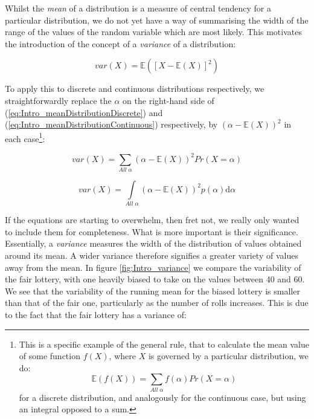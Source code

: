 \documentclass[11pt,fullpage]{book}
\begin{document}
Whilst the \textit{mean} of a distribution is a measure of central tendency for a particular distribution, we do not yet have a way of summarising the width of the range of the values of the random variable which are most likely. This motivates the introduction of the concept of a \textit{variance} of a distribution:

\begin{equation}\label{eq:Intro_varianceDistributionExpectations}
var(X) = \mathbb{E}\left(\left[X-\mathbb{E}(X)\right]^2\right)
\end{equation}

To apply this to discrete and continuous distributions respectively, we straightforwardly replace the $\alpha$ on the right-hand side of (\ref{eq:Intro_meanDistributionDiscrete}) and (\ref{eq:Intro_meanDistributionContinuous}) respectively, by $(\alpha-\mathbb{E}(X))^2$ in each case\footnote{This is a specific example of the general rule, that to calculate the mean value of some function $f(X)$, where $X$ is governed by a particular distribution, we do: \begin{equation}
\mathbb{E}(f(X)) = \sum\limits_{All\; \alpha} f(\alpha) Pr(X=\alpha)
\end{equation}
for a discrete distribution, and analogously for the continuous case, but using an integral opposed to a sum.}:

\begin{equation}\label{eq:Intro_varianceDistributionDiscrete}
var(X) = \sum\limits_{All\; \alpha} (\alpha-\mathbb{E}(X))^2 Pr(X=\alpha)
\end{equation}

\begin{equation}\label{eq:Intro_varianceDistributionContinuous}
var(X) = \int\limits_{All\; \alpha} (\alpha-\mathbb{E}(X))^2 p(\alpha)\mathrm{d}\alpha
\end{equation}

If the equations are starting to overwhelm, then fret not, we really only wanted to include them for completeness. What is more important is their significance. Essentially, a \textit{variance} measures the width of the distribution of values obtained around its mean. A wider variance therefore signifies a greater variety of values away from the mean. In figure \ref{fig:Intro_variance} we compare the variability of the fair lottery, with one heavily biased to take on the values between 40 and 60. We see that the variability of the running mean for the biased lottery is smaller than that of the fair one, particularly as the number of rolls increases. This is due to the fact that the fair lottery has a variance of:
\end{document}
